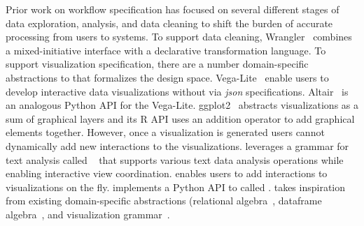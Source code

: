 
Prior work on workflow specification has focused on several different stages of data exploration, analysis,
and data cleaning to shift the burden of accurate processing
from users to systems. To support data
cleaning, Wrangler~\cite{kandel2011wrangler} combines a mixed-initiative interface with a declarative transformation language.
To support visualization specification,
there are a number domain-specific
abstractions to that formalizes the design space. Vega-Lite~\cite{satyanarayan2016vega} enable
users to develop 
interactive data visualizations without
via \emph{json} specifications. 
Altair~\cite{vanderplas2018altair} is an analogous Python API for the Vega-Lite. 
ggplot2~\cite{wickham2016ggplot2}
abstracts visualizations as a sum of graphical layers
and its R API uses an addition operator to add graphical elements together.
However, once a visualization is generated
users cannot dynamically add new
interactions to the visualizations.
\system leverages a grammar for
text analysis called \vta~\cite{rahman2017ve} that
supports various text data analysis operations while enabling interactive view coordination. \vta enables users to add interactions to visualizations on the fly. \system implements a Python API to \vta called \vital.
\vta takes inspiration from existing 
domain-specific abstractions (\eg relational algebra~\cite{codd}, dataframe algebra~\cite{modin,lara}, and visualization grammar~\cite{satyanarayan2016vega}.






